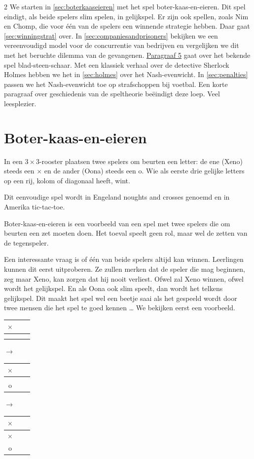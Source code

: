 \begin{multicols}{2}
We starten in \autoref{sec:boterkaaseieren} met het spel boter-kaas-en-eieren. Dit spel eindigt, als beide spelers slim spelen, in gelijkspel. Er zijn ook spellen, zoals Nim en Chomp, die voor één van de spelers een winnende strategie hebben. Daar gaat \autoref{sec:winningstrat} over. In \autoref{sec:companiesandprisoners} bekijken we een vereenvoudigd model voor de concurrentie van bedrijven en vergelijken we dit met het beruchte dilemma van de gevangenen. \hyperref[sec:bladsteenschaar]{Paragraaf 5} gaat over het bekende spel blad-steen-schaar. Met een klassiek verhaal over de detective Sherlock Holmes hebben we het in \autoref{sec:holmes} over het Nash-evenwicht. In \autoref{sec:penalties} passen we het Nash-evenwicht toe op strafschoppen bij voetbal. Een korte paragraaf over geschiedenis van de speltheorie beëindigt deze loep. Veel leesplezier.

\section{Boter-kaas-en-eieren}\label{sec:boterkaaseieren}

In een $3\times3$-rooster plaatsen twee spelers om beurten een letter: de ene (Xeno) steeds een $\times$ en de ander (Oona) steeds een o. Wie als eerste drie gelijke letters op een rij, kolom of diagonaal heeft, wint.

Dit eenvoudige spel wordt in Engeland noughts and crosses genoemd en in Amerika tic-tac-toe.

Boter-kaas-en-eieren is een voorbeeld van een spel met twee spelers die om beurten een zet moeten doen. Het toeval speelt geen rol, maar wel de zetten van de tegenspeler.

Een interessante vraag is of één van beide spelers altijd kan winnen. Leerlingen kunnen dit eerst uitproberen. Ze zullen merken dat de speler die mag beginnen, zeg maar Xeno, kan zorgen dat hij nooit verliest. Ofwel zal Xeno winnen, ofwel wordt het gelijkspel. En als Oona ook slim speelt, dan wordt het telkens gelijkspel. Dit maakt het spel wel een beetje saai als het gespeeld wordt door twee mensen die het spel te goed kennen … We bekijken eerst een voorbeeld.

\begin{tabular}{c|c|c}
  $\times$ & \; & \; \\      \hline
   &  &  \\      \hline
   &  & 
\end{tabular}
$\rightarrow$
\begin{tabular}{c|c|c}
  $\times$ & \; & \; \\      \hline
   &  &  \\      \hline
  o &  & 
\end{tabular}
$\rightarrow$
\begin{tabular}{c|c|c}
  $\times$ & \; & \; \\      \hline
  $\times$ &  &  \\      \hline
  o &  & 
\end{tabular}


\end{multicols}
